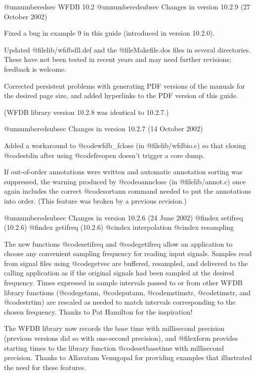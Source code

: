{{{{{{{{@unnumberedsec WFDB 10.2
@unnumberedsubsec Changes in version 10.2.9 (27 October 2002)

Fixed a bug in example 9 in this guide (introduced in version 10.2.0).

Updated @file{lib/wfdbdll.def} and the @file{Makefile.dos} files in several
directories.  These have not been tested in recent years and may need further
revisions; feedback is welcome.

Corrected persistent problems with generating PDF versions of the manuals for
the desired page size, and added hyperlinks to the PDF version of this guide.

(WFDB library version 10.2.8 was identical to 10.2.7.)

@unnumberedsubsec Changes in version 10.2.7 (14 October 2002)

Added a workaround to @code{wfdb_fclose} (in @file{lib/wfdbio.c}) so that
closing @code{stdin} after using @code{freopen} doesn't trigger a core dump.

If out-of-order annotations were written and automatic annotation sorting was
suppressed, the warning produced by @code{oannclose} (in @file{lib/annot.c})
once again includes the correct @code{sortann} command needed to put the
annotations into order.  (This feature was broken by a previous revision.)

@unnumberedsubsec Changes in version 10.2.6 (24 June 2002)
@findex setifreq (10.2.6)
@findex getifreq (10.2.6)
@cindex interpolation
@cindex resampling

The new functions @code{setifreq} and @code{getifreq} allow an
application to choose any convenient sampling frequency for reading
input signals.  Samples read from signal files using @code{getvec} are
buffered, resampled, and delivered to the calling application as if the
original signals had been sampled at the desired frequency.  Times
expressed in sample intervals passed to or from other WFDB library
functions (@code{getann}, @code{putann}, @code{mstimstr}, @code{timstr},
and @code{strtim}) are rescaled as needed to match intervals
corresponding to the chosen frequency.  Thanks to Pat Hamilton for the
inspiration!

The WFDB library now records the base time with millisecond precision
(previous versions did so with one-second precision), and @file{xform}
provides starting times to the library function @code{setbasetime} with
millisecond precision.  Thanks to Allavatam Venugopal for providing
examples that illustrated the need for these features.

}}}}}}}}

